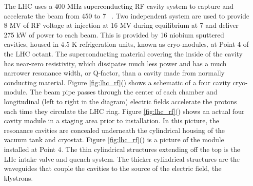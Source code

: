 \par The LHC uses a 400 MHz superconducting RF cavity system to
capture and accelerate the beam from 450 \GeV to 7
\TeV~\cite{lhc:machine_description}.  Two independent system are used
to provide 8 MV of RF voltage at injection at 16 MV during equilibrium
at 7 \TeV and deliver 275 kW of power to each beam.  This is provided
by 16 niobium sputtered cavities, housed in 4.5 K refrigeration units,
known as cryo-modules, at Point 4 of the LHC octant.  The
superconducting material covering the inside of the cavity has
near-zero resistivity, which dissipates much less power and has a much
narrower resonance width, or Q-factor, than a cavity made from
normally conducting material. Figure
\ref{fig:lhc_rf}() shows a schematic of a four
cavity cryo-module.  The beam pipe passes through the center of each
chamber and longitudinal (left to right in the diagram) electric
fields accelerate the protons each time they circulate the LHC
ring. Figure \ref{fig:lhc_rf}() shows an
actual four cavity module in a staging area prior to installation.  In
this picture, the resonance cavities are concealed underneath the
cylindrical housing of the vacuum tank and cryostat.  Figure
\ref{fig:lhc_rf}() is a picture of the
module installed at Point 4.  The thin cylindrical structures
extending off the top is the LHe intake valve and quench system.  The
thicker cylindrical structures are the waveguides that couple the
cavities to the source of the electric field, the klystrons.   

